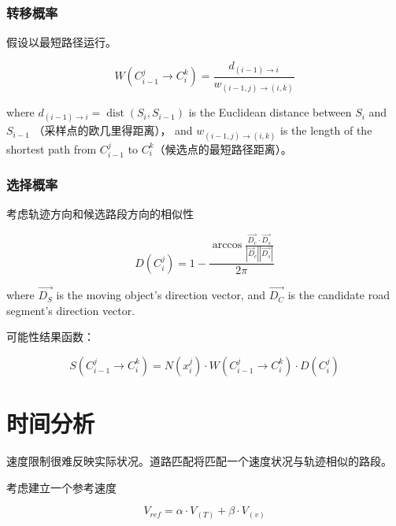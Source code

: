 \subsubsection{转移概率}

假设以最短路径运行。

\begin{equation} W\left(C_{i-1}^{j} \rightarrow C_{i}^{k}\right)=\frac{d_{(i-1) \rightarrow i}}{w_{(i-1, j) \rightarrow(i, k)}} \end{equation}

where $ d_{(i-1) \rightarrow i}=\operatorname{dist}\left(S_{i}, S_{i-1}\right) $ is the Euclidean distance between $ S_{i} $ and $ S_{i-1} $ （采样点的欧几里得距离）， and $ w_{(i-1, j) \longrightarrow(i, k)} $ is the length of the shortest path from $ C_{i-1}^{j} $ to $ C_{i}^{k} $（候选点的最短路径距离）。

\subsubsection{选择概率}

考虑轨迹方向和候选路段方向的相似性

\begin{equation} D\left(C_{i}^{j}\right)=1-\frac{\arccos \frac{\overrightarrow{D_{c}} \cdot \overrightarrow{D_{s}}}{\left|\vec{D}_{c}\right|\left|\overrightarrow{{D}_{s}}\right|}}{2 \pi} \end{equation}

where $ \overrightarrow{D_{S}} $ is the moving object's direction vector, and $ \overrightarrow{D_{C}} $ is the candidate road segment's direction vector.

可能性结果函数：

\begin{equation} S\left(C_{i-1}^{j} \rightarrow C_{i}^{k}\right)=N\left(x_{i}^{j}\right) \cdot W\left(C_{i-1}^{j} \rightarrow C_{i}^{k}\right) \cdot D\left(C_{i}^{j}\right) \end{equation}

\section{时间分析}

速度限制很难反映实际状况。道路匹配将匹配一个速度状况与轨迹相似的路段。

考虑建立一个参考速度

\begin{equation} V_{r e f}=\alpha \cdot V_{(T)}+\beta \cdot V_{(v)} \end{equation}

